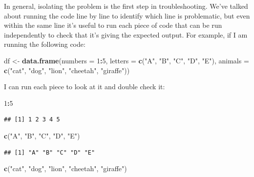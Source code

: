 \documentclass[
]{book}
\newenvironment{Shaded}{\begin{snugshade}}{\end{snugshade}}
\newcommand{\AttributeTok}[1]{\textcolor[rgb]{0.13,0.29,0.53}{#1}}
\newcommand{\DecValTok}[1]{\textcolor[rgb]{0.00,0.00,0.81}{#1}}
\newcommand{\FunctionTok}[1]{\textcolor[rgb]{0.13,0.29,0.53}{\textbf{#1}}}
\newcommand{\NormalTok}[1]{#1}
\newcommand{\OtherTok}[1]{\textcolor[rgb]{0.56,0.35,0.01}{#1}}
\newcommand{\SpecialCharTok}[1]{\textcolor[rgb]{0.81,0.36,0.00}{\textbf{#1}}}
\newcommand{\StringTok}[1]{\textcolor[rgb]{0.31,0.60,0.02}{#1}}
\begin{document}
In general, isolating the problem is the first step in troubleshooting. We've
talked about running the code line by line to identify which line is problematic,
but even within the same line it's useful to run each piece of code that can be
run independently to check that it's giving the expected output. For example,
if I am running the following code:

\begin{Shaded}
\begin{Highlighting}[]
\NormalTok{df }\OtherTok{\textless{}{-}} \FunctionTok{data.frame}\NormalTok{(}\AttributeTok{numbers =} \DecValTok{1}\SpecialCharTok{:}\DecValTok{5}\NormalTok{,}
                 \AttributeTok{letters =} \FunctionTok{c}\NormalTok{(}\StringTok{"A"}\NormalTok{, }\StringTok{"B"}\NormalTok{, }\StringTok{"C"}\NormalTok{, }\StringTok{"D"}\NormalTok{, }\StringTok{"E"}\NormalTok{),}
                 \AttributeTok{animals =} \FunctionTok{c}\NormalTok{(}\StringTok{"cat"}\NormalTok{, }\StringTok{"dog"}\NormalTok{, }\StringTok{"lion"}\NormalTok{, }\StringTok{"cheetah"}\NormalTok{, }\StringTok{"giraffe"}\NormalTok{))}
\end{Highlighting}
\end{Shaded}

I can run each piece to look at it and double check it:

\begin{Shaded}
\begin{Highlighting}[]
\DecValTok{1}\SpecialCharTok{:}\DecValTok{5}
\end{Highlighting}
\end{Shaded}

\begin{verbatim}
## [1] 1 2 3 4 5
\end{verbatim}

\begin{Shaded}
\begin{Highlighting}[]
\FunctionTok{c}\NormalTok{(}\StringTok{"A"}\NormalTok{, }\StringTok{"B"}\NormalTok{, }\StringTok{"C"}\NormalTok{, }\StringTok{"D"}\NormalTok{, }\StringTok{"E"}\NormalTok{)}
\end{Highlighting}
\end{Shaded}

\begin{verbatim}
## [1] "A" "B" "C" "D" "E"
\end{verbatim}

\begin{Shaded}
\begin{Highlighting}[]
\FunctionTok{c}\NormalTok{(}\StringTok{"cat"}\NormalTok{, }\StringTok{"dog"}\NormalTok{, }\StringTok{"lion"}\NormalTok{, }\StringTok{"cheetah"}\NormalTok{, }\StringTok{"giraffe"}\NormalTok{)}
\end{Highlighting}
\end{Shaded}
\end{document}
